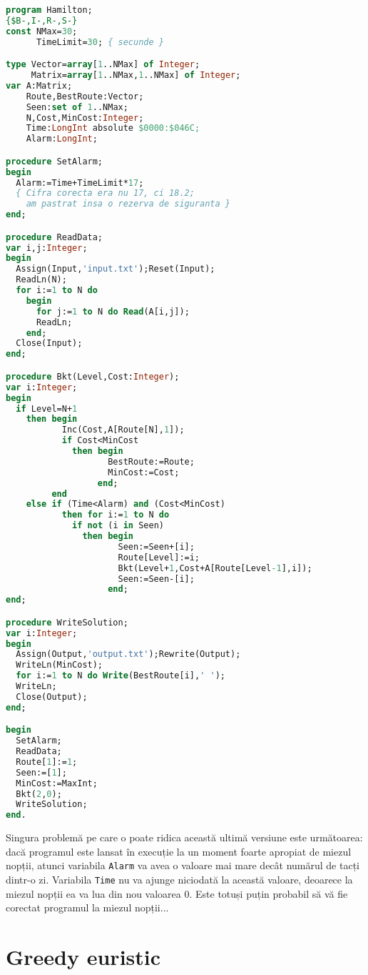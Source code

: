 \begin{lstlisting}[language=Pascal]
program Hamilton;
{$B-,I-,R-,S-}
const NMax=30;
      TimeLimit=30; { secunde }

type Vector=array[1..NMax] of Integer;
     Matrix=array[1..NMax,1..NMax] of Integer;
var A:Matrix;
    Route,BestRoute:Vector;
    Seen:set of 1..NMax;
    N,Cost,MinCost:Integer;
    Time:LongInt absolute $0000:$046C;
    Alarm:LongInt;

procedure SetAlarm;
begin
  Alarm:=Time+TimeLimit*17;
  { Cifra corecta era nu 17, ci 18.2;
    am pastrat insa o rezerva de siguranta }
end;

procedure ReadData;
var i,j:Integer;
begin
  Assign(Input,'input.txt');Reset(Input);
  ReadLn(N);
  for i:=1 to N do
    begin
      for j:=1 to N do Read(A[i,j]);
      ReadLn;
    end;
  Close(Input);
end;

procedure Bkt(Level,Cost:Integer);
var i:Integer;
begin
  if Level=N+1
    then begin
           Inc(Cost,A[Route[N],1]);
           if Cost<MinCost
             then begin
                    BestRoute:=Route;
                    MinCost:=Cost;
                  end;
         end
    else if (Time<Alarm) and (Cost<MinCost)
           then for i:=1 to N do
             if not (i in Seen)
               then begin
                      Seen:=Seen+[i];
                      Route[Level]:=i;
                      Bkt(Level+1,Cost+A[Route[Level-1],i]);
                      Seen:=Seen-[i];
                    end;
end;

procedure WriteSolution;
var i:Integer;
begin
  Assign(Output,'output.txt');Rewrite(Output);
  WriteLn(MinCost);
  for i:=1 to N do Write(BestRoute[i],' ');
  WriteLn;
  Close(Output);
end;

begin
  SetAlarm;
  ReadData;
  Route[1]:=1;
  Seen:=[1];
  MinCost:=MaxInt;
  Bkt(2,0);
  WriteSolution;
end.
\end{lstlisting}

Singura problemă pe care o poate ridica această ultimă versiune este
următoarea: dacă programul este lansat în execuție la un moment foarte
apropiat de miezul nopții, atunci variabila {\tt Alarm} va avea o valoare mai
mare decât numărul de tacți dintr-o zi. Variabila {\tt Time} nu va ajunge
niciodată la această valoare, deoarece la miezul nopții ea va lua din nou
valoarea 0. Este totuși puțin probabil să vă fie corectat programul la miezul
nopții...

\section{Greedy euristic}

